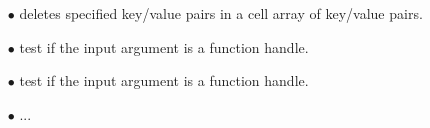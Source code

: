 
\begin{itemize}
\item[$\bullet$]  deletes specified key/value pairs in a cell array of key/value pairs.
\item[$\bullet$]  test if the input argument is a function handle.
\item[$\bullet$]  test if the input argument is a function handle.
\item[$\bullet$]  ...
\end{itemize}

